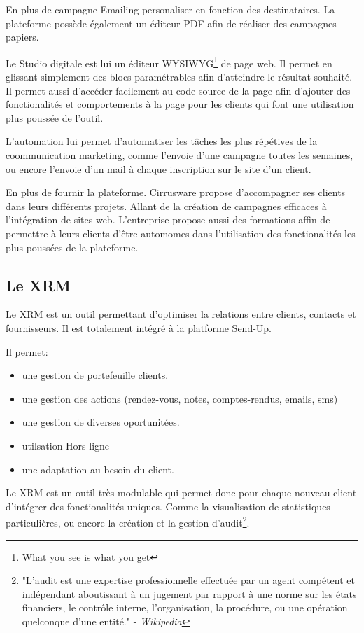En plus de campagne Emailing personaliser en fonction des destinataires. La plateforme possède également un éditeur PDF afin de réaliser des campagnes papiers. 

Le Studio digitale est lui un éditeur WYSIWYG\footnote{What you see is what you get} de page web. Il permet en glissant simplement des blocs paramétrables afin d'atteindre le résultat souhaité. Il permet aussi d'accéder facilement au code source de la page afin d'ajouter des fonctionalités et comportements à la page pour les clients qui font une utilisation plus poussée de l'outil.

L'automation lui permet d'automatiser les tâches les plus répétives de la coommunication marketing, comme l'envoie d'une campagne toutes les semaines, ou encore l'envoie d'un mail à chaque inscription sur le site d'un client. 

En plus de fournir la plateforme. Cirrusware propose d'accompagner ses clients dans leurs différents projets. Allant de la création de campagnes efficaces à l'intégration de sites web. L'entreprise propose aussi des formations affin de permettre à leurs clients d'être automomes dans l'utilisation des fonctionalités les plus poussées de la plateforme.

\subsection{Le XRM}
Le XRM est un outil permettant d'optimiser la relations entre clients, contacts et fournisseurs. Il est totalement intégré à la platforme Send-Up.

Il permet: 
\begin{itemize}
    \item une gestion de portefeuille clients. 
    \item une gestion des actions (rendez-vous, notes, comptes-rendus, emails, sms)
    \item une gestion de diverses oportunitées. 
    \item utilsation Hors ligne
    \item une adaptation au besoin du client. 
\end{itemize}

Le XRM est un outil très modulable qui permet donc pour chaque nouveau client d'intégrer des fonctionalités uniques. Comme la visualisation de statistiques particulières, ou encore la création et la gestion d'audit\footnote{"L’audit est une expertise professionnelle effectuée par un agent compétent et indépendant aboutissant à un jugement par rapport à une norme sur les états financiers, le contrôle interne, l'organisation, la procédure, ou une opération quelconque d'une entité." - \textit{Wikipedia}\cite{audit}}. 

